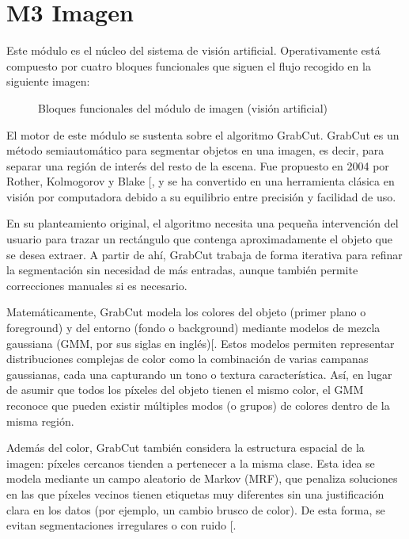 \documentclass[a4paper,10pt,spanish]{jupyterBook}
\begin{document}
\section{M3 \sphinxhyphen{} Imagen}
\label{\detokenize{content/01/Modulo-3:m3-imagen}}\label{\detokenize{content/01/Modulo-3::doc}}
\sphinxAtStartPar
Este módulo es el núcleo del sistema de visión artificial. Operativamente está compuesto por cuatro bloques funcionales que siguen el flujo recogido en la siguiente imagen:

\begin{figure}[htbp]
\centering
\capstart

\noindent{}
\caption{Bloques funcionales del módulo de imagen (visión artificial)}\label{\detokenize{content/01/Modulo-3:figura-wp1-imagen-6}}\end{figure}

\sphinxAtStartPar
El motor de este módulo se sustenta sobre el algoritmo GrabCut. GrabCut es un método semiautomático para segmentar objetos en una imagen, es decir, para separar una región de interés del resto de la escena. Fue propuesto en 2004 por Rother, Kolmogorov y Blake {[}\sphinxhref{https://doi.org/10.1145/1015706.1015720}{Rother et al., 2004}{]}, y se ha convertido en una herramienta clásica en visión por computadora debido a su equilibrio entre precisión y facilidad de uso.

\sphinxAtStartPar
En su planteamiento original, el algoritmo necesita una pequeña intervención del usuario para trazar un rectángulo que contenga aproximadamente el objeto que se desea extraer. A partir de ahí, GrabCut trabaja de forma iterativa para refinar la segmentación sin necesidad de más entradas, aunque también permite correcciones manuales si es necesario.

\sphinxAtStartPar
Matemáticamente, GrabCut modela los colores del objeto (primer plano o foreground) y del entorno (fondo o background) mediante modelos de mezcla gaussiana (GMM, por sus siglas en inglés){[}\sphinxhref{https://doi.org/10.1007/978-1-4615-7566-5}{Bishop, 2006}{]}. Estos modelos permiten representar distribuciones complejas de color como la combinación de varias campanas gaussianas, cada una capturando un tono o textura característica. Así, en lugar de asumir que todos los píxeles del objeto tienen el mismo color, el GMM reconoce que pueden existir múltiples modos (o grupos) de colores dentro de la misma región.

\sphinxAtStartPar
Además del color, GrabCut también considera la estructura espacial de la imagen: píxeles cercanos tienden a pertenecer a la misma clase. Esta idea se modela mediante un campo aleatorio de Markov (MRF), que penaliza soluciones en las que píxeles vecinos tienen etiquetas muy diferentes sin una justificación clara en los datos (por ejemplo, un cambio brusco de color). De esta forma, se evitan segmentaciones irregulares o con ruido {[}\sphinxhref{https://doi.org/10.1007/978-1-84882-437-9}{Li, 2009}{]}.
\end{document}
